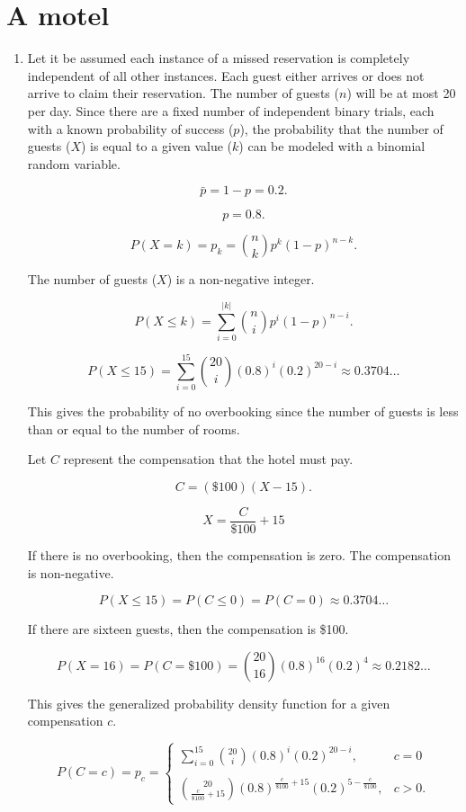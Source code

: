 \documentclass[12pt]{article}
\begin{document}
\section{A motel}
\begin{enumerate}
\item
Let it be assumed each instance of a missed reservation is completely independent of all other instances. Each guest either arrives or does not arrive to claim their reservation. The number of guests ($n$) will be at most 20 per day. Since there are a fixed number of independent binary trials, each with a known probability of success ($p$), the probability that the number of guests ($X$) is equal to a given value ($k$) can be modeled with a binomial random variable. 

\[\bar{p}=1-p=0.2.\]

\[p=0.8.\]

\[P(X=k)=p_k={\binom{n}{k}}p^k(1-p)^{n-k}.\]

The number of guests ($X$) is a non-negative integer.

\[P(X\leq k)=\sum^{|k|}_{i=0}{\binom{n}{i}p^i(1-p)^{n-i}}.\]

\[P(X\leq 15)=\sum^{15}_{i=0}{\binom{20}{i}(0.8)^i(0.2)^{20-i}\approx 0.3704}\dots\]

This gives the probability of no overbooking since the number of guests is less than or equal to the number of rooms.

Let $C$ represent the compensation that the hotel must pay.

\[C=(\$100)(X-15).\]

\[X=\frac{C}{\$100}+15\]

If there is no overbooking, then the compensation is zero. The compensation is non-negative. 

\[P(X\leq 15)=P(C\leq 0)=P(C=0)\approx 0.3704\dots\]

If there are sixteen guests, then the compensation is \$100.

\[P(X=16)=P(C=\$100)=\binom{20}{16}(0.8)^{16}(0.2)^4\approx 0.2182\dots\]

This gives the generalized probability density function for a given compensation $c$.

\begin{equation}
P(C=c)=p_c=\begin{cases}
    \sum^{15}_{i=0}{\binom{20}{i}(0.8)^i(0.2)^{20-i}},&c=0\\\\
    \binom{20}{\frac{c}{\$100}+15}(0.8)^{\frac{c}{\$100}+15}(0.2)^{5-\frac{c}{\$100}},&c>0.
\end{cases}
\end{equation}


\end{enumerate}
\end{document}
